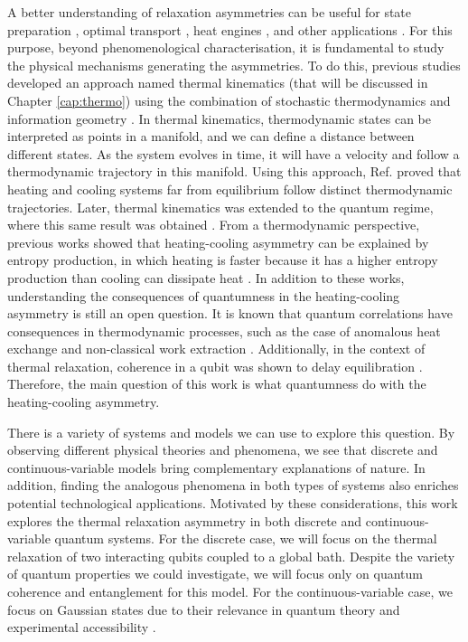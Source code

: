 A better understanding of relaxation asymmetries can be useful for state preparation \cite{verstraete-2009, harrington-2022}, optimal transport \cite{walker-2023}, heat engines \cite{liu-2024, liu-2026}, and other applications \cite{teza-2026}. For this purpose, beyond phenomenological characterisation, it is fundamental to study the physical mechanisms generating the asymmetries. To do this, previous studies developed an approach named thermal kinematics (that will be discussed in Chapter \ref{cap:thermo}) using the combination of stochastic thermodynamics and information geometry \cite{ito-2018, dechant-2020,ibanez-2024}. In thermal kinematics, thermodynamic states can be interpreted as points in a manifold, and we can define a distance between different states. As the system evolves in time, it will have a velocity and follow a thermodynamic trajectory in this manifold. Using this approach, Ref. \cite{ibanez-2024} proved that heating and cooling systems far from equilibrium follow distinct thermodynamic trajectories. Later, thermal kinematics was extended to the quantum regime, where this same result was obtained \cite{tejero-2025}. From a thermodynamic perspective, previous works showed that heating-cooling asymmetry can be explained by entropy production, in which heating is faster because it has a higher entropy production than cooling can dissipate heat \cite{tejero-misc-2025}. In addition to these works, understanding the consequences of quantumness in the heating-cooling asymmetry is still an open question. It is known that quantum correlations have consequences in thermodynamic processes, such as the case of anomalous heat exchange \cite{amikam-2020} and non-classical work extraction \cite{paternostro-2020, campaioli-2024}. Additionally, in the context of thermal relaxation, coherence in a qubit was shown to delay equilibration \cite{krissia-2024}. Therefore, the main question of this work is what quantumness do with the heating-cooling asymmetry.

There is a variety of systems and models we can use to explore this question. By observing different physical theories and phenomena, we see that discrete and continuous-variable models bring complementary explanations of nature. In addition, finding the analogous phenomena in both types of systems also enriches potential technological applications. Motivated by these considerations, this work explores the thermal relaxation asymmetry in both discrete and continuous-variable quantum systems. For the discrete case, we will focus on the thermal relaxation of two interacting qubits coupled to a global bath. Despite the variety of quantum properties we could investigate, we will focus only on quantum coherence and entanglement for this model. For the continuous-variable case, we focus on Gaussian states due to their relevance in quantum theory and experimental accessibility \cite{brunelli-2018, adesso-2016, stefanini-2026}.

